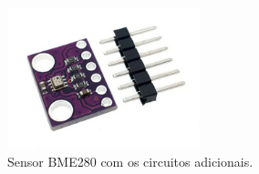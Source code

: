 



\begin{figure}[ht]
    \centering
    \caption{Sensor BME280 com os circuitos adicionais.}
    \begin{center}
        \includegraphics[width=0.50\textwidth]{img/BMP280.png}
    \end{center}
    \vspace{-0.5cm}
    \label{fig:BMP280}
\end{figure}